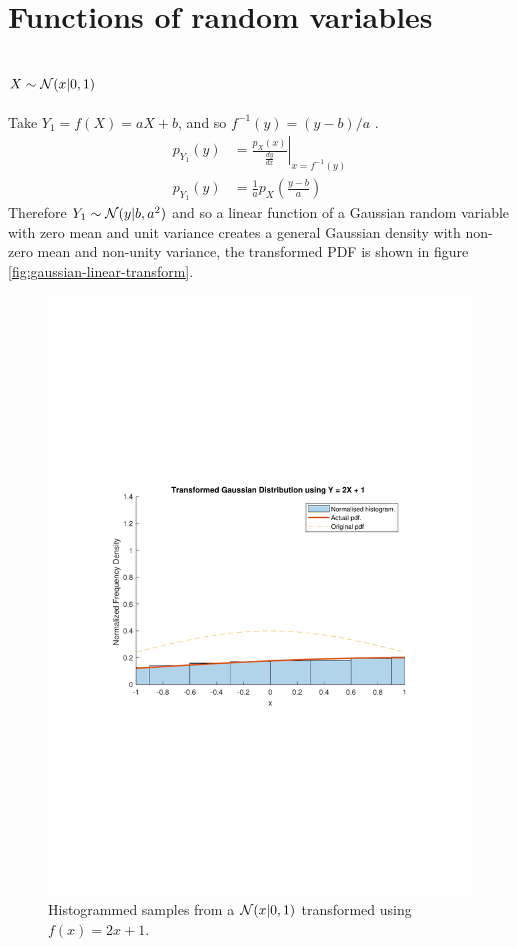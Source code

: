 \documentclass[12pt]{article}
\begin{document}
\section{Functions of random variables}

\subsection{$X \sim {\cal N}(x|0,1)$}

Take ${Y_1} = f(X) = aX + b$, and so $f^{-1}(y) = (y - b) / a$ .
\begin{align}
p_{Y_1}(y) &= \left. \frac {p_X(x)} {\frac {dy} {dx}} \right|_{x = f^ {-1} (y)} \nonumber \\
p_{Y_1}(y) &= \frac 1 a  {p_X \left (\frac {y - b} a \right)}
\end{align}
Therefore $Y_1 \sim {\cal N}(y|b, a^2)$ and so a linear function of a Gaussian random variable with zero mean and unit variance creates a general Gaussian density with non-zero mean and non-unity variance, the transformed PDF is shown in figure \ref{fig:gaussian-linear-transform}.

\begin{figure}[H]
	\includegraphics[width=\textwidth]{figures/gaussian-linear-transform.pdf}
  \caption{Histogrammed samples from a ${\cal N}(x|0,1)$ transformed using $f(x) = 2x + 1$.}
  \label{fig:guassian-linear-transform}
\end{figure}
\end{document}
